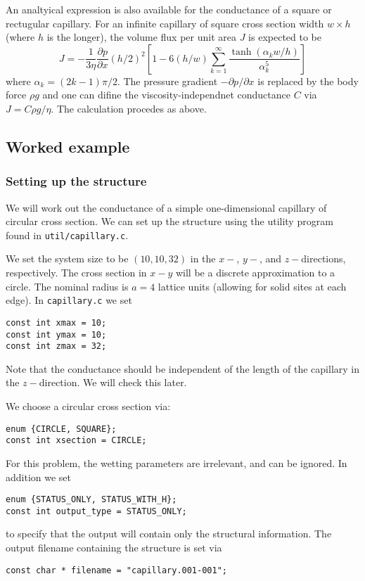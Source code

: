 An analtyical expression is also available for the conductance
of a square or rectugular capillary. For an infinite capillary
of square cross section width $w \times h$ (where $h$ is the
longer),
the volume flux per unit area $J$ is expected to be
\cite{papanastasiou,edo1}
\begin{equation}
J = - \frac{1}{3\eta} \frac{\partial p}{\partial x} (h/2)^2
\left[
1 - 6(h/w) \sum_{k=1}^{\infty} \frac{\tanh(\alpha_k w/h)}{\alpha_k^5} 
\right]
\end{equation}
where $\alpha_k = (2k - 1)\pi/2$. The pressure gradient
$-\partial p / \partial x$ is replaced by the body force $\rho g$ and
one can difine the viscosity-independnet conductance $C$ via
$J = C\rho g / \eta$. The calculation procedes as above.

\subsection{Worked example}

\subsubsection{Setting up the structure}

We will work out the conductance of a simple one-dimensional capillary
of circular cross section. We can set up the structure using the
utility program found in \texttt{util/capillary.c}.

We set the system size to be $(10,10,32)$ in the $x-$, $y-$, and
$z-$directions, respectively. The cross section in $x-y$ will be
a discrete  approximation to a circle. The nominal radius is
$a = 4$ lattice units (allowing for solid sites at each edge).
In \texttt{capillary.c} we
set
\begin{verbatim}
const int xmax = 10;
const int ymax = 10;
const int zmax = 32;
\end{verbatim}
Note that the conductance should be independent of the length of the
capillary in the $z-$direction. We will check this later.

We choose a circular cross section via:
\begin{verbatim}
enum {CIRCLE, SQUARE};
const int xsection = CIRCLE;
\end{verbatim}
For this problem, the wetting parameters are irrelevant, and can be
ignored. In addition we set
\begin{verbatim}
enum {STATUS_ONLY, STATUS_WITH_H};
const int output_type = STATUS_ONLY;
\end{verbatim}
to specify that the output will contain only the structural information.
The output filename containing the structure is set via
\begin{verbatim}
const char * filename = "capillary.001-001";
\end{verbatim}

